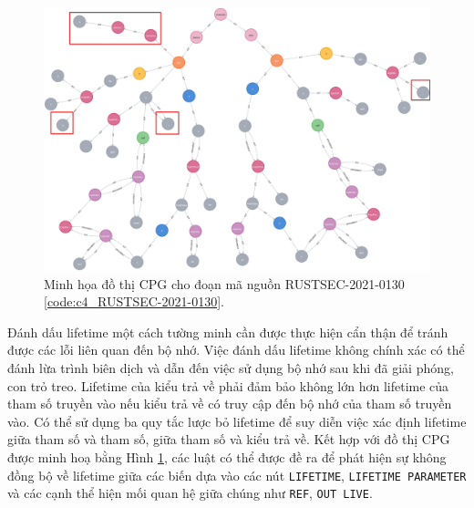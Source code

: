 \begin{figure}[H]
    \includegraphics[width=1\columnwidth]{figures/c4/c4_RUSTSEC-2021-0130.png}
    \centering
    \caption{Minh họa đồ thị CPG cho đoạn mã nguồn RUSTSEC-2021-0130 \ref{code:c4_RUSTSEC-2021-0130}.}
    \label{img:c4_RUSTSEC-2021-0130}
\end{figure}

Đánh dấu lifetime một cách tường minh cần được thực hiện cẩn thận để tránh được các lỗi liên quan đến bộ nhớ.
Việc đánh dấu lifetime không chính xác có thể đánh lừa trình biên dịch và dẫn đến việc sử dụng bộ nhớ sau khi đã giải phóng, con trỏ treo.
Lifetime của kiểu trả về phải đảm bảo không lớn hơn lifetime của tham số truyền vào nếu kiểu trả về có truy cập đến bộ nhớ của tham số truyền vào.
Có thể sử dụng ba quy tắc lược bỏ lifetime để suy diễn việc xác định lifetime giữa tham số và tham số, giữa tham số và kiểu trả về.
Kết hợp với đồ thị CPG được minh hoạ bằng Hình \ref{img:c4_RUSTSEC-2021-0130}, các luật có thể được đề ra để phát hiện sự không đồng bộ về lifetime giữa các biến dựa vào các nút \texttt{LIFETIME},
\texttt{LIFETIME PARAMETER} và các cạnh thể hiện mối quan hệ giữa chúng như \texttt{REF}, \texttt{OUT LIVE}.
